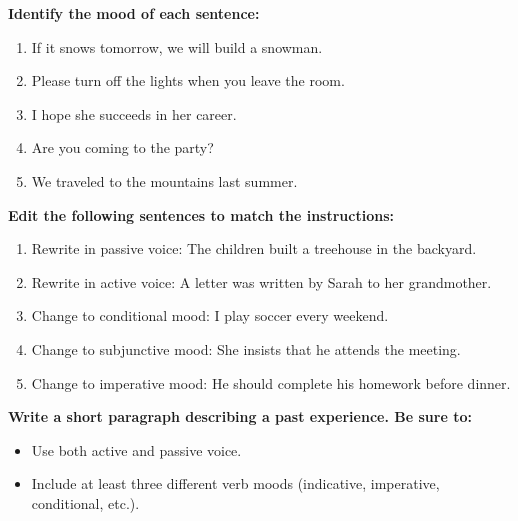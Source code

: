 \documentclass[12pt]{article}
\begin{document}
\vspace{1em}

\begin{tcolorbox}[colframe=black!60, colback=white, 
coltitle=black, colbacktitle=black!15, fonttitle=\bfseries\Large, 
title=Practice with Verb Moods, halign title=center, left=10pt, right=10pt, top=10pt, bottom=15pt]
\textbf{Identify the mood of each sentence:}
\begin{enumerate}[itemsep=3em]
    \item If it snows tomorrow, we will build a snowman.  
    \item Please turn off the lights when you leave the room.  
    \item I hope she succeeds in her career.  
    \item Are you coming to the party?  
    \item We traveled to the mountains last summer.
\end{enumerate}
\end{tcolorbox}

\vspace{1em}

\begin{tcolorbox}[colframe=black!60, colback=white, 
coltitle=black, colbacktitle=black!15, fonttitle=\bfseries\Large, 
title=Editing Exercises, halign title=center, left=10pt, right=10pt, top=10pt, bottom=15pt]
\textbf{Edit the following sentences to match the instructions:}
\begin{enumerate}[itemsep=3em]
    \item Rewrite in passive voice: The children built a treehouse in the backyard.  
    \item Rewrite in active voice: A letter was written by Sarah to her grandmother.  
    \item Change to conditional mood: I play soccer every weekend.  
    \item Change to subjunctive mood: She insists that he attends the meeting.  
    \item Change to imperative mood: He should complete his homework before dinner.
\end{enumerate}
\end{tcolorbox}

\vspace{1em}

\begin{tcolorbox}[colframe=black!60, colback=white, 
coltitle=black, colbacktitle=black!15, fonttitle=\bfseries\Large, 
title=Exit Ticket, halign title=center, left=10pt, right=10pt, top=5pt, bottom=15pt]

\textbf{Write a short paragraph describing a past experience. Be sure to:}
\begin{itemize}
    \item Use both active and passive voice.  
    \item Include at least three different verb moods (indicative, imperative, conditional, etc.).  
\end{itemize}

\vspace{8em}

\end{tcolorbox}
\end{document}
